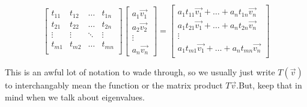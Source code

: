 \documentclass[letterpaper]{article}
\begin{document}
\[
\left[ \begin{array}{cccc}
t_{11} & t_{12} & \ldots & t_{1n} \\
t_{21} & t_{22} & \ldots & t_{2n} \\
\vdots & \vdots & \ddots & \vdots \\
t_{m1} & t_{m2} & \ldots & t_{mn} \\
\end{array} \right]
%
\left[ \begin{array}{c}
a_1\vec{v_1} \\
a_2\vec{v_2} \\ 
\vdots \\ 
a_n\vec{v_n}
\end{array} \right]
%
=
%
\left[ \begin{array}{c}
a_1t_{11}\vec{v_1} + \ldots + a_nt_{1n}\vec{v_n} \\
a_1t_{21}\vec{v_1} + \ldots + a_nt_{2n}\vec{v_n} \\
\vdots \\
a_1t_{m1}\vec{v_1} + \ldots + a_nt_{mn}\vec{v_n} \\
\end{array} \right]
\]

This is an awful lot of notation to wade through, so we usually just write $T(\vec{v})$ to interchangably mean the function or the matrix product $T\vec{v}$.\footnotemark But, keep that in mind when we talk about eigenvalues. 
\end{document}
